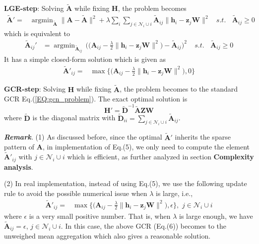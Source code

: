 \documentclass{article}
\begin{document}
  \textbf{LGE-step}: Solving $\widetilde{\mathbf{A}}$ while fixing $\mathbf{H}$, the problem becomes
\begin{align}
\widetilde{\mathbf{A}}' = &\mathop{\arg\min}_{\widetilde{\mathbf{A}}}\big\|\mathbf{A}-\widetilde{\mathbf{A}}\big\|^2 +\lambda\sum_i\sum_{j\in \mathcal{N}_i\cup i}
 \widetilde{\mathbf{A}}_{ij}\big\| \mathbf{h}_i - \mathbf{z}_j\mathbf{W}\big\|^2
\ \ \ \ s.t. \ \ \ \  \widetilde{\mathbf{A}}_{ij} \geq 0 \nonumber
\end{align}
which is equivalent to
\begin{align}
{\widetilde{\mathbf{A}}}_{ij}'& =  \mathop{\arg\min}_{\widetilde{\mathbf{A}}_{ij}}\, \Big(\big(\mathbf{A}_{ij}-\frac{\lambda}{2}\|\mathbf{h}_i- \mathbf{z}_j\mathbf{W}\|^2\big)-\widetilde{\mathbf{A}}_{ij}\Big)^2 \  \  \  \  \ s.t.\ \ \ \  \widetilde{\mathbf{A}}_{ij} \geq 0 \nonumber
\end{align}
It has a simple closed-form solution which is given as 
\begin{align}\label{EQ:solveS}
\widetilde{\mathbf{A}}'_{ij} =& \max\Big\{\big(\mathbf{A}_{ij} - \frac{\lambda}{2}\|\mathbf{h}_i- \mathbf{z}_j\mathbf{W}\|^2\big), 0\Big\}
\end{align}


\textbf{GCR-step}: Solving $\mathbf{H}$ while fixing $\widetilde{\mathbf{A}}$, the problem becomes
to the standard GCR Eq.(\ref{EQ:gcn_problem}). The exact optimal solution is
\begin{equation}\label{EQ:solveH}
\mathbf{H}' = \widetilde{\mathbf{D}}^{-1}\widetilde{\mathbf{A}}\mathbf{Z}\mathbf{W}
\end{equation}
where $\widetilde{\mathbf{D}}$ is the diagonal matrix with $\widetilde{\mathbf{D}}_{ii}=\sum_{j\in \mathcal{N}_i\cup i}\widetilde{\mathbf{A}}_{ij}$.

\emph{\textbf{Remark}.}
(1) As discussed before, since the optimal $\widetilde{\mathbf{A}}'$ inherits the sparse pattern of $\mathbf{A}$, 
 in implementation of Eq.(5), we only need to compute the element $\widetilde{\mathbf{A}}'_{ij}$  with  $j\in \mathcal{N}_i\cup i$ which is efficient, as further analyzed in section \textbf{Complexity analysis}.

 (2) In real implementation, instead of using Eq.(5), we use the following update rule to avoid the possible numerical issue when $\lambda$ is large, i.e.,
\begin{align}\label{EQ:solveS}
\widetilde{\mathbf{A}}'_{ij} =& \max\Big\{\big(\mathbf{A}_{ij} - \frac{\lambda}{2}\|\mathbf{h}_i- \mathbf{z}_j\mathbf{W}\|^2\big), \epsilon \Big\}, \,\, j \in \mathcal{N}_i\cup i
\end{align}
where $\epsilon$ is a very small positive number. That is, when $\lambda$ is large enough, we have $\widetilde{\mathbf{A}}_{ij}=\epsilon$, $j \in \mathcal{N}_i\cup i$. In this case, the above GCR (Eq.(6)) becomes to the unweighed mean aggregation which also gives a reasonable solution.
\end{document}
